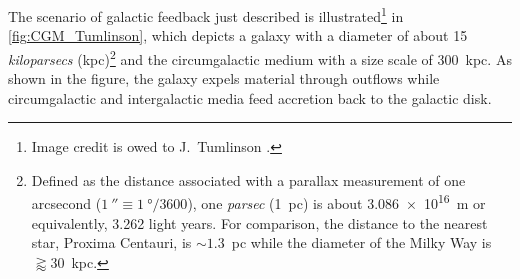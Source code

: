 The scenario of galactic feedback just described is illustrated\footnote{Image credit is owed to J.\ Tumlinson \cite{Tumlinson17}.} in \cref{fig:CGM_Tumlinson}, which depicts a galaxy with a diameter of about \num{15} \emph{kiloparsecs} (kpc)\footnote{Defined as the distance associated with a parallax measurement of one arcsecond ($\SI{1}{\arcsecond} \equiv \SI{1}{\degree}/3600$), one \emph{parsec} (\num{1}~pc) is about \SI{3.086e16}{\metre} or equivalently, \num{3.262} light years. For comparison, the distance to the nearest star, Proxima Centauri, is $\sim \num{1.3}$~pc while the diameter of the Milky Way is $\gtrapprox 30$~kpc.} and the circumgalactic medium with a size scale of \num{300}~kpc. 
As shown in the figure, the galaxy expels material through outflows while circumgalactic and intergalactic media feed accretion back to the galactic disk. 

